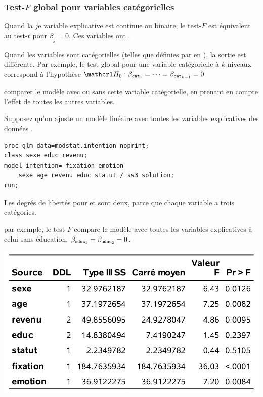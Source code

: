 \documentclass[xcolor={dvipsnames}]{beamer}
\begin{document}
\begin{frame}[fragile]
\frametitle{Test-$F$ global pour variables catégorielles}

\bi
\item Quand la $j$e variable explicative est continue ou binaire, le test-$F$ est  \alert{équivalent} au test-$t$ pour $\beta_j=0$. Ces variables ont .
\item Quand les variables sont catégorielles (telles que définies par   en \SASlang), la sortie est différente. Par exemple, le test global pour une variable catégorielle  à $k$ niveaux correspond à l'hypothèse $\Hy_0: \beta_{\code{cat}_1}= \cdots = \beta_{\code{cat}_{k-1}}=0$
\item comparer le modèle avec ou sans cette variable catégorielle, en prenant en compte l'effet de toutes les autres variables.
\ei
\end{frame}
\begin{frame}[fragile]
Supposez qu'on ajuste un modèle linéaire avec toutes les variables explicatives des données .
\begin{tcolorbox}[colback=white, colframe=hecblue, title=Code \SASlang pour ajuste le modèle linéaire complet]
\begin{verbatim}
proc glm data=modstat.intention noprint;
class sexe educ revenu;
model intention= fixation emotion 
    sexe age revenu educ statut / ss3 solution;
run;
\end{verbatim}
\end{tcolorbox}
\end{frame}
\begin{frame}

\bi \item 
Les degrés de libertés pour  et  sont deux, parce que chaque variable a trois catégories.
\item par exemple, le test $F$ compare le modèle avec toutes les variables explicatives à celui sans éducation, $\beta_{\texttt{educ}_1} = \beta_{\texttt{educ}_2}=0$.
\ei
\begin{center}
\includegraphics[width = 0.7\linewidth]{img/c2/diapos3-e10.png}
\end{center}

\end{frame}
\end{document}

